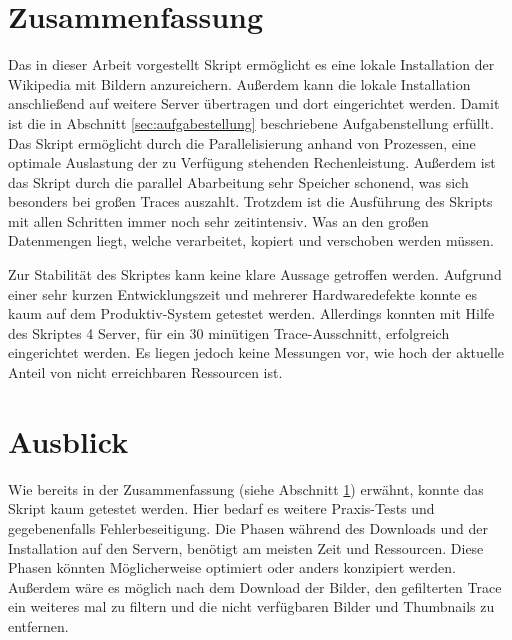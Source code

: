 \section{Zusammenfassung}
\label{sec:zusammenfassung}

Das in dieser Arbeit vorgestellt Skript ermöglicht es eine lokale Installation der Wikipedia mit Bildern anzureichern. Außerdem kann die lokale Installation anschließend auf weitere Server übertragen und dort eingerichtet werden. Damit ist die in Abschnitt \ref{sec:aufgabestellung} beschriebene Aufgabenstellung erfüllt. Das Skript ermöglicht durch die Parallelisierung anhand von Prozessen, eine optimale Auslastung der zu Verfügung stehenden Rechenleistung. Außerdem ist das Skript durch die parallel Abarbeitung sehr Speicher schonend, was sich besonders bei großen Traces auszahlt. Trotzdem ist die Ausführung des Skripts mit allen Schritten immer noch sehr zeitintensiv. Was an den großen Datenmengen liegt, welche verarbeitet, kopiert und verschoben werden müssen. 

Zur Stabilität des Skriptes kann keine klare Aussage getroffen werden. Aufgrund einer sehr kurzen Entwicklungszeit und mehrerer Hardwaredefekte konnte es kaum auf dem Produktiv-System getestet werden. Allerdings konnten mit Hilfe des Skriptes 4 Server, für ein 30 minütigen Trace-Ausschnitt, erfolgreich eingerichtet werden. Es liegen jedoch keine Messungen vor, wie hoch der aktuelle Anteil von nicht erreichbaren Ressourcen ist.

\section{Ausblick}
\label{sec:ausblick}

Wie bereits in der Zusammenfassung (siehe Abschnitt \ref{sec:zusammenfassung}) erwähnt, konnte das Skript kaum getestet werden. Hier bedarf es weitere Praxis-Tests und gegebenenfalls Fehlerbeseitigung. Die Phasen während des Downloads und der Installation auf den Servern, benötigt am meisten Zeit und Ressourcen. Diese Phasen könnten Möglicherweise optimiert oder anders konzipiert werden. Außerdem wäre es möglich nach dem Download der Bilder, den gefilterten Trace ein weiteres mal zu filtern und die nicht verfügbaren Bilder und Thumbnails zu entfernen.


